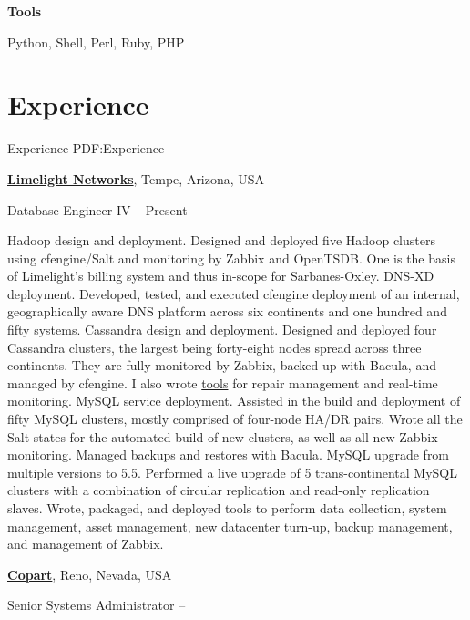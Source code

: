 \documentclass[letterpaper,10pt,oneside]{article}
\begin{document}
\begin{body}
\textbf{Tools}\par
Python, Shell, Perl, Ruby, PHP
\SmallEntryGap


\section
{Experience}
{Experience}
{PDF:Experience}

\href{http://www.limelight.com/}
{\textbf{Limelight Networks}},
Tempe, Arizona, USA
\par
Database Engineer IV
\hfill
{} -- Present

\begin{detail}

\BulletItem
Hadoop design and deployment.  Designed and deployed five Hadoop clusters using cfengine/Salt and monitoring by Zabbix and OpenTSDB.  One is the basis of Limelight's billing system and thus in-scope for Sarbanes-Oxley.
\BulletItem
DNS-XD deployment.  Developed, tested, and executed cfengine deployment of an internal, geographically aware DNS platform across six continents and one hundred and fifty systems.
\BulletItem
Cassandra design and deployment.  Designed and deployed four Cassandra clusters, the largest being forty-eight nodes spread across three continents.  They are fully monitored by Zabbix, backed up with Bacula, and managed by cfengine.  I also wrote \href{https://github.com/BrianGallew/cassandra\_tools}{tools} for repair management and real-time monitoring.
\BulletItem
MySQL service deployment.  Assisted in the build and deployment of fifty MySQL clusters, mostly comprised of four-node HA/DR pairs.  Wrote all the Salt states for the automated build of new clusters, as well as all new Zabbix monitoring.  Managed backups and restores with Bacula.
\BulletItem
MySQL upgrade from multiple versions to 5.5.  Performed a live upgrade of 5 trans-continental MySQL clusters with a combination of circular replication and read-only replication slaves.
\BulletItem
Wrote, packaged, and deployed tools to perform data collection, system management, asset management, new datacenter turn-up, backup management, and management of Zabbix.
\end{detail}
\EntryGap

\href{http://www.copart.com/}
{\textbf{Copart}},
Reno, Nevada, USA
\par
Senior Systems Administrator
\hfill
{} -- 


\end{body}
\end{document}

